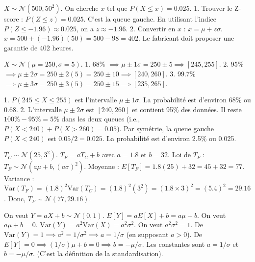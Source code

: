 \begin{correctionbox}
$X \sim \mathcal{N}(500, 50^2)$. On cherche $x$ tel que $P(X \le x) = 0.025$.
1.  Trouver le Z-score : $P(Z \le z) = 0.025$. C'est la queue gauche.
    En utilisant l'indice $P(Z \le -1.96) \approx 0.025$, on a $z \approx -1.96$.
2.  Convertir en $x$ : $x = \mu + z\sigma$.
    $x = 500 + (-1.96)(50) = 500 - 98 = 402$.
    Le fabricant doit proposer une garantie de 402 heures.
\end{correctionbox}


\begin{correctionbox}
$X \sim \mathcal{N}(\mu=250, \sigma=5)$.
1.  68\% $\implies \mu \pm 1\sigma = 250 \pm 5 \implies [245, 255]$.
2.  95\% $\implies \mu \pm 2\sigma = 250 \pm 2(5) = 250 \pm 10 \implies [240, 260]$.
3.  99.7\% $\implies \mu \pm 3\sigma = 250 \pm 3(5) = 250 \pm 15 \implies [235, 265]$.
\end{correctionbox}

\begin{correctionbox}
1.  $P(245 \le X \le 255)$ est l'intervalle $\mu \pm 1\sigma$.
    La probabilité est d'environ 68\% ou 0.68.
2.  L'intervalle $\mu \pm 2\sigma$ est $[240, 260]$ et contient 95\% des données.
    Il reste $100\% - 95\% = 5\%$ dans les deux queues (i.e., $P(X < 240) + P(X > 260) = 0.05$).
    Par symétrie, la queue gauche $P(X < 240)$ est $0.05 / 2 = 0.025$.
    La probabilité est d'environ 2.5\% ou 0.025.
\end{correctionbox}


\begin{correctionbox}
$T_C \sim \mathcal{N}(25, 3^2)$. $T_F = a T_C + b$ avec $a=1.8$ et $b=32$.
Loi de $T_F$ : $T_F \sim \mathcal{N}(a\mu + b, (a\sigma)^2)$.
Moyenne : $E[T_F] = 1.8(25) + 32 = 45 + 32 = 77$.
Variance : $\text{Var}(T_F) = (1.8)^2 \text{Var}(T_C) = (1.8)^2 (3^2) = (1.8 \times 3)^2 = (5.4)^2 = 29.16$.
Donc, $T_F \sim \mathcal{N}(77, 29.16)$.
\end{correctionbox}

\begin{correctionbox}
On veut $Y = aX+b \sim \mathcal{N}(0, 1)$.
$E[Y] = aE[X] + b = a\mu + b$. On veut $a\mu + b = 0$.
$\text{Var}(Y) = a^2 \text{Var}(X) = a^2 \sigma^2$. On veut $a^2 \sigma^2 = 1$.
De $\text{Var}(Y)=1 \implies a^2 = 1/\sigma^2 \implies a = 1/\sigma$ (en supposant $a>0$).
De $E[Y]=0 \implies (1/\sigma)\mu + b = 0 \implies b = -\mu/\sigma$.
Les constantes sont $a = 1/\sigma$ et $b = -\mu/\sigma$. (C'est la définition de la standardisation).
\end{correctionbox}

